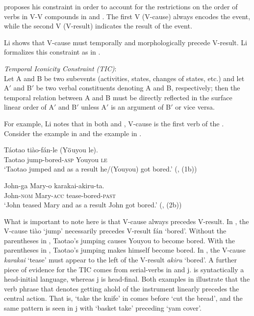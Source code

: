 \documentclass[output=paper]{LSP/langsci}
\begin{document}
\citet[499]{Li1993} proposes his constraint in order to account for the restrictions on the order of verbs in V-V  compounds in  and . The first V (V-cause) always encodes the event, while the second V (V-result) indicates the result of the event. 

Li shows that V-cause must temporally and morphologically precede V-result. Li formalizes this constraint as in .

\begin{exe}

\ex\label{ex:rosen:32}
 \emph{Temporal Iconicity Constraint (TIC)}:\\
 Let A and B be two subevents (activities, states, changes of states, etc.) and let A$'$ and B$'$ be two verbal constituents denoting A and B, respectively; then the temporal relation between A and B must be directly reflected in the surface linear order of A$'$ and B$'$ unless A$'$ is an argument of B$'$ or vice versa.
 
 \end{exe}

For example, Li notes that in both  and , V-cause is the first verb of the . Consider the  example in  and the  example in .

 \begin{exe}
 \ex \label{ex:rosen:33}
 \gll Táotao tiào-fán-le (Y$\overline{\rm{o}}$uyou le).\\
 Taotao jump-bored-\textsc{asp} Youyou \textsc{le}\\
 \glt `Taotao jumped and as a result he/(Youyou) got bored.' (\citealt[480]{Li1993}, (1b))
 
 \ex \label{ex:rosen:34}
\gll John-ga Mary-o karakai-akiru-ta.\\
 John-\textsc{nom} Mary-\textsc{acc} tease-bored-\textsc{past}\\
 \glt `John teased Mary and as a result John got bored.'  (\citealt[481]{Li1993}, (2b))
 
 \end{exe}

What is important to note here is that V-cause always precedes V-result. In , the V-cause ti\`ao `jump' necessarily precedes V-result f\'an `bored'. Without the parentheses in , Taotao's jumping causes Youyou to become bored. With the parentheses in , Taotao's jumping makes himself become bored. In , the V-cause \textit{karakai} `tease' must appear to the left of the V-result \textit{akiru} `bored'. A further piece of evidence for the TIC comes from serial-verbs in  and j.  is syntactically a head-initial language, whereas j is head-final. Both examples in  illustrate that the verb phrase that denotes getting ahold of the instrument linearly precedes the central action. That is, `take the knife' in  comes before `cut the bread', and the same pattern is seen in j with `basket take' preceding `yam cover'.
\end{document}
